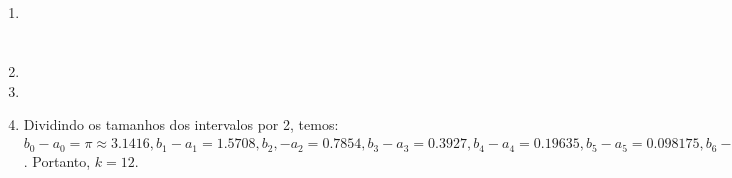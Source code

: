 \documentclass[a4paper]{article}
\begin{document}
\begin{enumerate}

\item %

\section{}


\item %

\item %

\item Dividindo os tamanhos dos intervalos por 2, temos: $b_0-a_0=\pi
  \approx 3.1416, b_1-a_1 = 1.5708, b_2,-a_2=0.7854, b_3-a_3=0.3927,
  b_4-a_4=0.19635, b_5-a_5=0.098175, b_6-a_6=0.0490875,
  b_7-a_7=0.02454375, b_8-a_8=0.012271875, b_9-a_9=0.006135938,
  b_{10}-a_{10}=0.003067969, b_{11}-a_{11}=0.001533984,
  b_{12}-a_{12}=0,000766992<10^{-3}$. Portanto,
  $k=12$. %


\end{enumerate}
\end{document}
